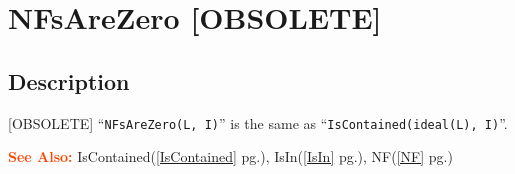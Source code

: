 \documentclass[a4paper]{mybook}
\newenvironment{command}{}{} %
\newcommand\SeeAlso{\par\textcolor{OrangeRed}{\textbf{\large See Also: }}}
\begin{document}
\section{NFsAreZero [OBSOLETE]}
\label{NFsAreZero [OBSOLETE]}
\begin{command} %



\subsection*{Description}

[OBSOLETE]
``\verb&NFsAreZero(L, I)&'' is the same as ``\verb&IsContained(ideal(L), I)&''.

\SeeAlso %
  IsContained(\ref{IsContained} pg.\pageref{IsContained}), 
    IsIn(\ref{IsIn} pg.\pageref{IsIn}), 
    NF(\ref{NF} pg.\pageref{NF})
\end{command} %
\end{document}
